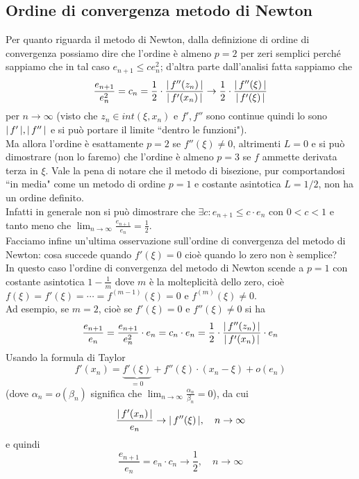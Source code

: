 \documentclass[12pt]{article}
\DeclarePairedDelimiter{\abs}{\lvert}{\rvert}
\begin{document}
\subsection{Ordine di convergenza metodo di Newton}
Per quanto riguarda il metodo di Newton, dalla definizione di ordine di convergenza possiamo dire che l'ordine è almeno $p=2$ per zeri semplici perché sappiamo che in tal caso $e_{n+1} \leq ce^2_n$; d'altra parte dall'analisi fatta sappiamo che
\[\frac{e_{n+1}}{e_n^2} = c_n = \frac{1}{2} \cdot \frac{\abs{\,f''(z_n)\,}}{\abs{\,f'(x_n)\,}} \to \frac{1}{2} \cdot \frac{\abs{\,f''(\xi)\,}}{\abs{\,f'(\xi)\,}}\]
per $n \to \infty$ (visto che $z_n \in int(\xi,x_n)$ e $f', f''$ sono continue quindi lo sono $\abs{\,f'\,}, \abs{\,f''\,}$ e si può portare il limite ``dentro le funzioni").\\
Ma allora l'ordine è esattamente $p=2$ se $f''(\xi) \neq 0$, altrimenti $L=0$ e si può dimostrare (non lo faremo) che l'ordine è almeno $p=3$ se $f$ ammette derivata terza in $\xi$.
\newline \newline
Vale la pena di notare che il metodo di bisezione, pur comportandosi ``in media" come un metodo di ordine $p=1$ e costante asintotica $L=1/2$, non ha un ordine definito.\\
Infatti in generale non si può dimostrare che $\exists c: e_{n+1} \leq c\cdot e_n$ con $0<c<1$ e tanto meno che $\lim_{n\to \infty} \frac{e_{n+1}}{e_n} = \frac{1}{2}$.\\
Facciamo infine un'ultima osservazione sull'ordine di convergenza del metodo di Newton: cosa succede quando  $f'(\xi) = 0$ cioè quando lo zero non è semplice?\\
In questo caso l'ordine di convergenza del metodo di Newton scende a $p=1$ con costante asintotica $1-\frac{1}{m}$ dove $m$ è la molteplicità dello zero, cioè $f(\xi) = f'(\xi) = \cdots = f^{(m-1)}(\xi) = 0$ e $f^{(m)}(\xi) \neq 0$.\\
Ad esempio, se $m=2$, cioè se $f'(\xi) = 0$ e $f''(\xi) \neq 0$ si ha
\[\frac{e_{n+1}}{e_n} = \frac{e_{n+1}}{e_n^2} \cdot e_n = c_n \cdot e_n = \frac{1}{2} \cdot \frac{\abs{\,f''(z_n)\,}}{\abs{\,f'(x_n)\,}} \cdot e_n\]
Usando la formula di Taylor
\[ f'(x_n)=\underbrace{f'(\xi)}_{=0} + f''(\xi)\cdot (x_n - \xi)+o(e_n) \]
(dove $\alpha_n = o(\beta_n)$ significa che $\lim_{n \to \infty} \frac{\alpha_n}{\beta_n} = 0$), da cui
\[\frac{\abs{\,f'(x_n)\,}}{e_n} \to \abs{\,f''(\xi)\,}, \quad n \to \infty\]
e quindi
\[ \frac{e_{n+1}}{e_n} = e_n \cdot c_n \to \frac{1}{2}, \quad n \to \infty \]
\end{document}
